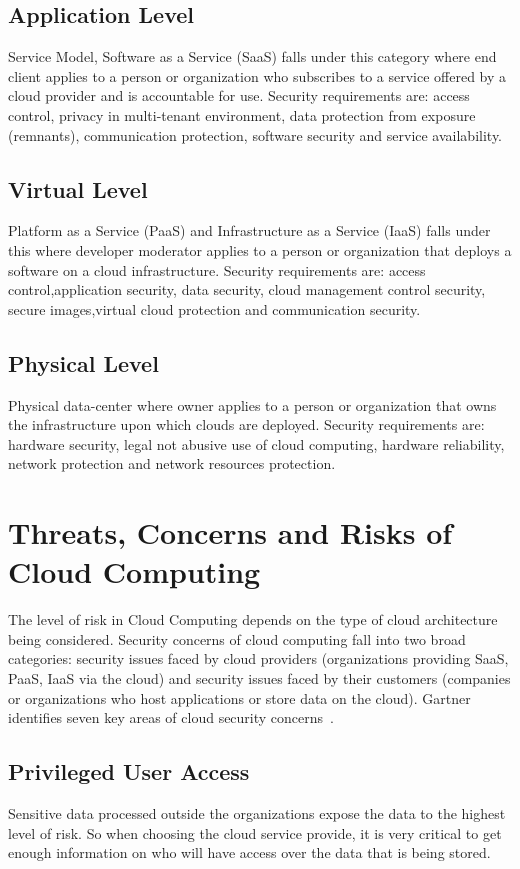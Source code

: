 \subsection{Application Level} 
Service Model, Software as a Service (SaaS) falls under this category 
where end client applies to a person or organization who subscribes
to a service offered by a cloud provider and is accountable for use. 
Security requirements are: access control, privacy in multi-tenant environment, 
data protection from exposure (remnants), communication protection, 
software security and service availability.

\subsection{Virtual Level}
Platform as a Service (PaaS) and Infrastructure as a Service (IaaS) falls 
under this where developer moderator applies to a person or organization 
that deploys a software on a cloud infrastructure. 
Security requirements are: access control,application security, data security,
cloud management control security, secure images,virtual cloud protection 
and communication security.

\subsection{Physical Level}
Physical data-center where owner applies to a person or organization 
that owns the infrastructure upon which clouds are deployed. 
Security requirements are: hardware security, legal not abusive 
use of cloud computing, hardware reliability, network protection 
and network resources protection.

\section{Threats, Concerns and Risks of Cloud Computing}
The level of risk in Cloud Computing depends on the type of cloud 
architecture being considered. Security concerns of cloud computing 
fall into two broad categories: security issues faced by cloud providers 
(organizations providing SaaS, PaaS, IaaS via the cloud) and 
security issues faced by their customers (companies or organizations who 
host applications or store data on the cloud). Gartner identifies seven key
areas of cloud security concerns~\cite{hid-sp18-513-gartner}.

\subsection{Privileged User Access}
Sensitive data processed outside the organizations expose the data to the
highest level of risk. So when choosing the cloud service provide, it is
very critical to get enough information on who will have access over the data
that is being stored.

